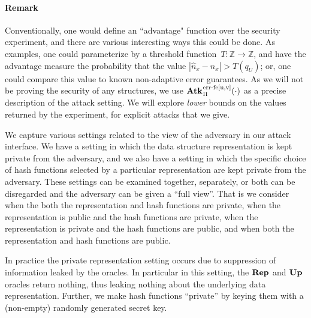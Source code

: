    
   
   \paragraph{Remark}
   Conventionally, one would define an ``advantage" function over the security experiment, and there are various interesting ways this could be done. As examples, 
   one could parameterize by a threshold function~$T \colon \mathbb{Z}\to\mathbb{Z}$, and have the advantage measure the probability that the value $|\hat{n}_x - n_x| > T(q_U)$; 
   or, one could compare this value to known non-adaptive error guarantees.  As we will not be proving the security of any structures, 
   we use $\ExpErrFe{\struct}{\cdot}{u,v}$ as a precise description of the attack setting.  We will explore \emph{lower} bounds on the values returned by the experiment,
   for explicit attacks that we give. 
   
   We capture various settings related to the view of the adversary in our attack interface. We have a setting in which the data structure representation is kept private from the adversary, and we also have a setting in which the specific choice of hash functions selected by a particular representation are kept private from the adversary.  These settings can be examined together, separately, or both can be disregarded and the adversary can be given a ``full view''. That is we consider when the both the representation and hash functions are private, when the representation is public and the hash functions are private, when the representation is private and the hash functions are public, and when both the representation and hash functions are public.
   
   In practice the private representation setting occurs due to suppression of information leaked by the oracles. In particular in this setting, the $\textup{\textbf{Rep}}\hspace{0.5pt}$ and $\textup{\textbf{Up}}\hspace{0.5pt}$ oracles return nothing, thus leaking nothing about the underlying data representation. Further, we make hash functions ``private'' by keying them with a (non-empty) randomly generated secret key. 
   